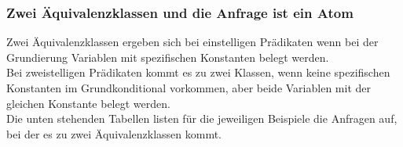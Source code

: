 \documentclass[draft]{scrreprt}
\begin{document}
\subsubsection {Zwei Äquivalenzklassen und die Anfrage ist ein Atom} \label{Atom_zweiKlassen}

	Zwei Äquivalenzklassen ergeben sich bei einstelligen Prädikaten wenn bei der Grundierung Variablen mit spezifischen Konstanten belegt werden. \\
	Bei zweistelligen Prädikaten kommt es zu zwei Klassen, wenn keine spezifischen Konstanten im Grundkonditional vorkommen, aber beide Variablen mit der gleichen Konstante belegt werden.\\
	Die unten stehenden Tabellen listen für die jeweiligen Beispiele die Anfragen auf, bei der es zu zwei Äquivalenzklassen kommt.




\fontsize{11pt}{13.2pt}\selectfont

\setlongtables
\end{document}
